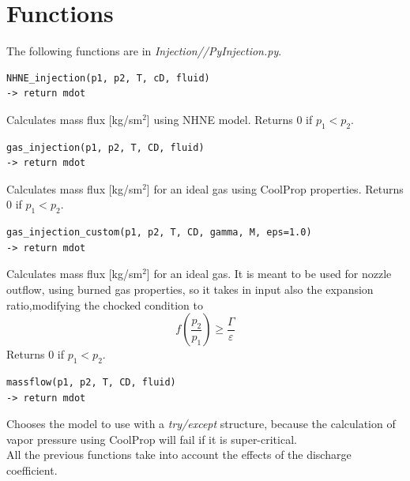 \section{Functions}
The following functions are in \textit{Injection//PyInjection.py}.
\begin{verbatim}
NHNE_injection(p1, p2, T, cD, fluid)
-> return mdot
\end{verbatim}
\hspace{2em} Calculates mass flux [kg/sm$^2$] using NHNE model.
Returns $0$ if $p_1<p_2$.
 \begin{verbatim}
gas_injection(p1, p2, T, CD, fluid)
-> return mdot
\end{verbatim}
\hspace{2em} Calculates mass flux [kg/sm$^2$] for an ideal gas using CoolProp properties.
Returns $0$ if $p_1<p_2$.
\begin{verbatim}
gas_injection_custom(p1, p2, T, CD, gamma, M, eps=1.0)
-> return mdot
\end{verbatim}
\hspace{2em} Calculates mass flux [kg/sm$^2$] for an ideal gas.
It is meant to be used for nozzle outflow, using burned gas properties, 
so it takes in input also the expansion ratio,modifying the chocked condition to
\begin{equation}
	f(\frac{p_2}{p_1}) \geq \frac{\Gamma}{\varepsilon}
\end{equation}
Returns $0$ if $p_1<p_2$.
\begin{verbatim}
massflow(p1, p2, T, CD, fluid)
-> return mdot
\end{verbatim}
\hspace{2em} Chooses the model to use with a \textit{try/except} structure, because the calculation of vapor pressure using CoolProp will
fail if it is super-critical.\\

All the previous functions take into account the effects of the discharge coefficient.





